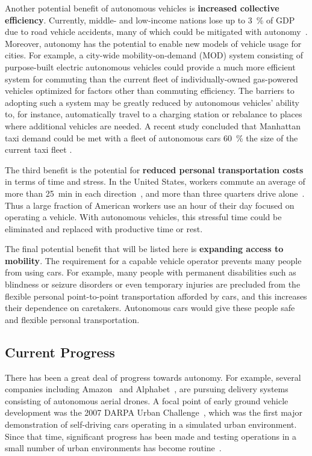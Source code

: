 Another potential benefit of autonomous vehicles is \textbf{increased collective efficiency}.
Currently, middle- and low-income nations lose up to \SI{3}{\percent} of GDP due to road vehicle accidents, many of which could be mitigated with autonomy~\cite{who2015global}.
Moreover, autonomy has the potential to enable new models of vehicle usage for cities.
For example, a city-wide mobility-on-demand (MOD) system consisting of purpose-built electric autonomous vehicles could provide a much more efficient system for commuting than the current fleet of individually-owned gas-powered vehicles optimized for factors other than commuting efficiency.
The barriers to adopting such a system may be greatly reduced by autonomous vehicles' ability to, for instance, automatically travel to a charging station or rebalance to places where additional vehicles are needed.
A recent study concluded that Manhattan taxi demand could be met with a fleet of autonomous cars \SI{60}{\percent} the size of the current taxi fleet \cite{RZ-MP:15_MODa}.

The third benefit is the potential for \textbf{reduced personal transportation costs} in terms of time and stress.
In the United States, workers commute an average of more than \SI{25}{\minute} in each direction~\cite{census2016travel}, and more than three quarters drive alone~\cite{mckenzie2015who}.
Thus a large fraction of American workers use an hour of their day focused on operating a vehicle.
With autonomous vehicles, this stressful time could be eliminated and replaced with productive time or rest.

The final potential benefit that will be listed here is \textbf{expanding access to mobility}.
The requirement for a capable vehicle operator prevents many people from using cars.
For example, many people with permanent disabilities such as blindness or seizure disorders or even temporary injuries are precluded from the flexible personal point-to-point transportation afforded by cars, and this increases their dependence on caretakers.
Autonomous cars would give these people safe and flexible personal transportation.

\subsection{Current Progress}

There has been a great deal of progress towards autonomy.
For example, several companies including Amazon~\cite{shaban2018amazon} and Alphabet~\cite{sandoval2018alphabet}, are pursuing delivery systems consisting of autonomous aerial drones.
A focal point of early ground vehicle development was the 2007 DARPA Urban Challenge~\cite{MB-KI-SS:10}, which was the first major demonstration of self-driving cars operating in a simulated urban environment.
Since that time, significant progress has been made and testing operations in a small number of urban environments has become routine~\cite{dolgov2016google}.

